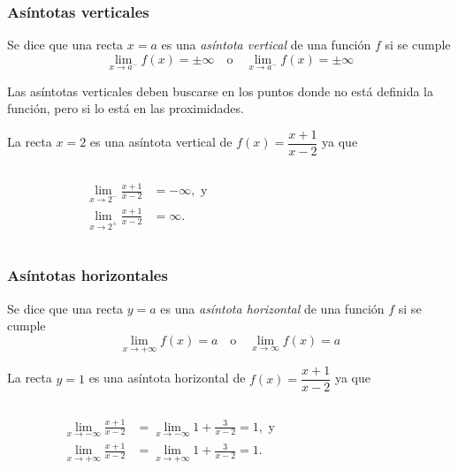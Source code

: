 \begin{frame}
\frametitle{Asíntotas verticales}
\begin{definicion}
Se dice que una recta $x=a$ es una \emph{asíntota vertical} de una función $f$ si se cumple
\[ \lim_{x\rightarrow a^-}f(x)=\pm \infty \quad \textrm{o} \quad \lim_{x\rightarrow a^-}f(x)=\pm \infty \]
\end{definicion}

Las asíntotas verticales deben buscarse en los puntos donde no está definida la función, pero si lo está en las proximidades.

 La recta $x=2$ es una asíntota vertical de $f(x)=\dfrac{x+1}{x-2}$ ya que
\begin{columns}
\begin{column}{0.3\textwidth}
\begin{align*}
\lim_{x\rightarrow 2^-}\frac{x+1}{x-2}&=-\infty, \textrm{ y}\\
\lim_{x\rightarrow 2^+}\frac{x+1}{x-2}&=\infty.
\end{align*}
\end{column}
\begin{column}{0.4\textwidth}
\begin{center}
\scalebox{1}{}
\end{center}
\end{column}
\end{columns}
\end{frame}


\begin{frame}
\frametitle{Asíntotas horizontales}
\begin{definicion}
Se dice que una recta $y=a$ es una \emph{asíntota horizontal} de una función $f$ si se cumple
\[ \lim_{x\rightarrow +\infty}f(x)=a \quad \textrm{o} \quad \lim_{x\rightarrow \infty}f(x)=a \]
\end{definicion}

 La recta $y=1$ es una asíntota horizontal de $f(x)=\dfrac{x+1}{x-2}$ ya que
\begin{columns}
\begin{column}{0.5\textwidth}
\begin{align*}
\lim_{x\rightarrow -\infty}\frac{x+1}{x-2}&= \lim_{x\rightarrow -\infty}1+\frac{3}{x-2} = 1, \textrm{ y}\\
\lim_{x\rightarrow +\infty}\frac{x+1}{x-2}&= \lim_{x\rightarrow +\infty}1+\frac{3}{x-2} = 1.
\end{align*}
\end{column}
\begin{column}{0.5\textwidth}
\begin{center}
\scalebox{1}{}
\end{center}
\end{column}
\end{columns}
\end{frame}


